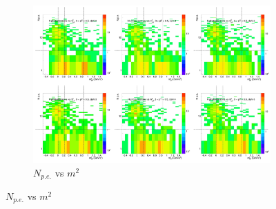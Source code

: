 \begin{figure}[H]
  \centering
    \begin{subfigure}{1\textwidth}
    \includegraphics[width=1\textwidth]{hiptfits/pos/PSaccthreshold_cent0_ich1_accfire0_ptbin12.jpg}
    \caption{$N_{p.e.}$ vs $m^2$}
    \end{subfigure}
\end{figure}
